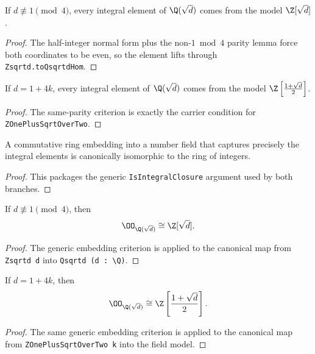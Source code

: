 \begin{lemma}\label{bp_lift_nonone}
  \leanok
  If $d \not\equiv 1 \pmod 4$, every integral element of $\Q(\sqrt{d})$ comes
  from the model $\Z[\sqrt{d}]$.
\end{lemma}
\begin{proof}
  The half-integer normal form plus the non-\(1 \bmod 4\) parity lemma force
  both coordinates to be even, so the element lifts through
  \verb|Zsqrtd.toQsqrtdHom|.
\end{proof}

\begin{lemma}\label{bp_lift_one}
  \leanok
  If $d = 1 + 4k$, every integral element of $\Q(\sqrt{d})$ comes from the
  model $\Z\left[\frac{1+\sqrt{d}}{2}\right]$.
\end{lemma}
\begin{proof}
  The same-parity criterion is exactly the carrier condition for
  \verb|ZOnePlusSqrtOverTwo|.
\end{proof}

\begin{lemma}\label{bp_equiv_embedding}
  \leanok
  A commutative ring embedding into a number field that captures precisely the
  integral elements is canonically isomorphic to the ring of integers.
\end{lemma}
\begin{proof}
  This packages the generic \verb|IsIntegralClosure| argument used by both branches.
\end{proof}

\begin{theorem}\label{bp_branch_nonone}
  \leanok
  If $d \not\equiv 1 \pmod 4$, then
  \[
  \OO_{\Q(\sqrt{d})} \cong \Z[\sqrt{d}].
  \]
\end{theorem}
\begin{proof}
  The generic embedding criterion is applied to the canonical map from
  \verb|Zsqrtd d| into \verb|Qsqrtd (d : \Q)|.
\end{proof}

\begin{theorem}\label{bp_branch_one}
  \leanok
  If $d = 1 + 4k$, then
  \[
  \OO_{\Q(\sqrt{d})}
  \cong
  \Z\left[\frac{1+\sqrt{d}}{2}\right].
  \]
\end{theorem}
\begin{proof}
  The same generic embedding criterion is applied to the canonical map from
  \verb|ZOnePlusSqrtOverTwo k| into the field model.
\end{proof}

